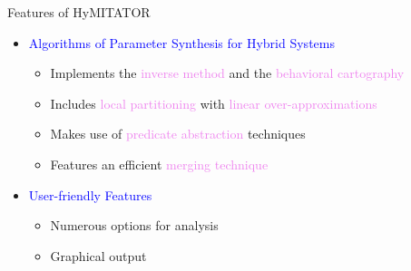 \documentclass[final]{beamer}
\newcommand{\refer}[1]{\textcolor{blue}{\cite{#1}}}
\newcommand{\couleur}[1]{\textcolor{violet}{#1}}
\newcommand{\coulitem}[1]{\textcolor{blue}{#1}}
\newcommand{\hymitator}{HyMITATOR} %
\begin{document}
\begin{frame}{}
\begin{columns}[t]
\begin{column}{.45\linewidth}
\begin{block}{Features of \hymitator{}}
\begin{itemize}
	\item \coulitem{Algorithms of Parameter Synthesis for Hybrid Systems}
	\begin{itemize}
		\item Implements the \couleur{inverse method} and the \couleur{behavioral cartography}
		\item Includes \couleur{local partitioning} with \couleur{linear over-approximations}
		\item Makes use of \couleur{predicate abstraction} techniques
		\item Features an efficient \couleur{merging technique}~\refer{afs12}
	\end{itemize}
	
	\vspace{0.5cm}

% 

	\item \coulitem{User-friendly Features}
	\begin{itemize}
		\item Numerous options for analysis
		\item Graphical output


\end{itemize}
\end{itemize}
\end{block}
\end{column}
\end{columns}
\end{frame}
\end{document}

